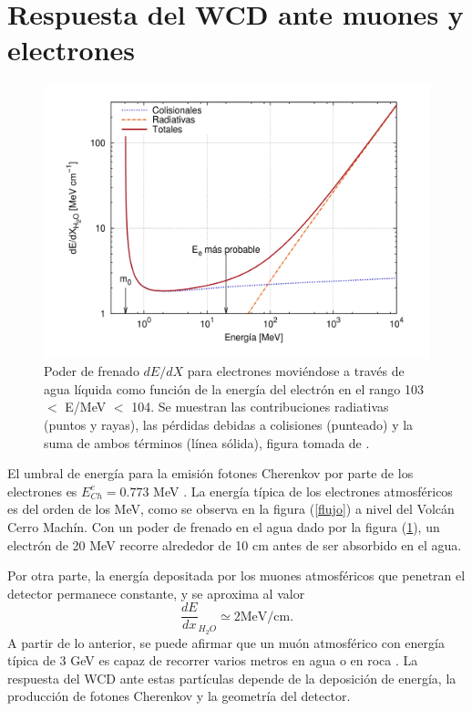 \documentclass[12pt,oneside,openany,letter]{book}
\begin{document}
\section{Respuesta del WCD ante muones y electrones}
\begin{figure}[h!]
    \centering
        \includegraphics[scale=0.4]{stopping_e.png}
   \caption[Poder de frenado del electrón en agua líquida]{Poder de frenado $dE/dX$ para electrones moviéndose a través de agua líquida como función de la energía del electrón en el rango 103 $<$ E/MeV $<$ 104. Se muestran las contribuciones radiativas (puntos y rayas), las pérdidas debidas a colisiones (punteado) y la suma de ambos términos (línea sólida), figura tomada de \cite{Asorey-phd2012}.}\label{stopping_e}
\end{figure}
El umbral de energ\'ia para la emisión fotones Cherenkov por parte de los electrones es $E^e_{Ch}=0.773$ MeV \cite{Asorey-phd2012}. La energía típica de los electrones atmosféricos es del orden de los MeV, como se observa en la figura (\ref{flujo}) a nivel del Volc\'an Cerro Mach\'in. Con un poder de frenado en el agua dado por la figura (\ref{stopping_e}), un electrón de 20 MeV recorre alrededor de 10 cm antes de ser absorbido en el agua.

Por otra parte, la energía depositada por los muones atmosféricos que penetran el detector permanece constante, y se aproxima al valor 
\begin{equation}
\frac{dE}{dx}_{H_2O} \simeq 2 \text{MeV/cm}.
\end{equation}
A partir de lo anterior, se puede afirmar que un muón atmosférico con energía típica de 3 GeV es capaz de recorrer varios metros en agua o en roca \cite{Asorey-phd2012}. La respuesta del WCD ante estas partículas depende de la deposición de energía, la producción de fotones Cherenkov y la geometría del detector. 
\end{document}
